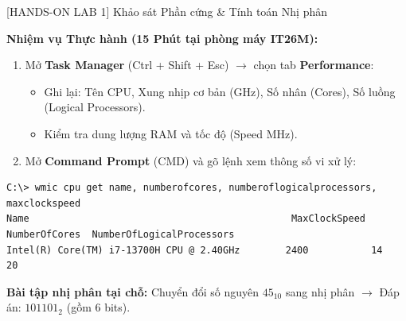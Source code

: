 \documentclass[aspectratio=169, 10pt]{beamer}
\begin{document}
\begin{frame}[fragile]{[HANDS-ON LAB 1] Khảo sát Phần cứng \& Tính toán Nhị phân}
  \begin{exampleblock}{\textbf{Nhiệm vụ Thực hành (15 Phút tại phòng máy IT26M):}}
    \begin{enumerate}
      \item Mở \textbf{Task Manager} (Ctrl + Shift + Esc) $\to$ chọn tab \textbf{Performance}:
      \begin{itemize}
        \item Ghi lại: Tên CPU, Xung nhịp cơ bản (GHz), Số nhân (Cores), Số luồng (Logical Processors).
        \item Kiểm tra dung lượng RAM và tốc độ (Speed MHz).
      \end{itemize}
      \item Mở \textbf{Command Prompt} (CMD) và gõ lệnh xem thông số vi xử lý:
    \end{enumerate}
  \end{exampleblock}
\begin{lstlisting}[style=terminalStyle]
C:\> wmic cpu get name, numberofcores, numberoflogicalprocessors, maxclockspeed
Name                                              MaxClockSpeed  NumberOfCores  NumberOfLogicalProcessors
Intel(R) Core(TM) i7-13700H CPU @ 2.40GHz        2400           14             20
\end{lstlisting}
  \begin{block}{\textbf{Bài tập nhị phân tại chỗ:}}
    Chuyển đổi số nguyên $45_{10}$ sang nhị phân $\to$ Đáp án: $101101_2$ (gồm 6 bits).
  \end{block}
\end{frame}
\end{document}
